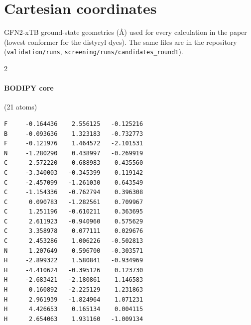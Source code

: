 \section{Cartesian coordinates}
GFN2-xTB ground-state geometries (\AA) used for every calculation in the paper (lowest conformer for the distyryl
dyes). The same files are in the repository (\texttt{validation/runs}, \texttt{screening/runs/candidates\_round1}).
\begin{multicols}{2}
\paragraph{BODIPY core} (21 atoms)
{\scriptsize\linespread{1}\selectfont\begin{verbatim}
F     -0.164436    2.556125   -0.125216
B     -0.093636    1.323183   -0.732773
F     -0.121976    1.464572   -2.101531
N     -1.280290    0.438997   -0.269919
C     -2.572220    0.688983   -0.435560
C     -3.340003   -0.345399    0.119142
C     -2.457099   -1.261030    0.643549
C     -1.154336   -0.762794    0.396308
C      0.090783   -1.282561    0.709967
C      1.251196   -0.610211    0.363695
C      2.611923   -0.940960    0.575629
C      3.358978    0.077111    0.029676
C      2.453286    1.006226   -0.502813
N      1.207649    0.596700   -0.303571
H     -2.899322    1.580841   -0.934969
H     -4.410624   -0.395126    0.123730
H     -2.683421   -2.180861    1.146583
H      0.160892   -2.225129    1.231863
H      2.961939   -1.824964    1.071231
H      4.426653    0.165134    0.004115
H      2.654063    1.931160   -1.009134
\end{verbatim}}

\end{multicols}
